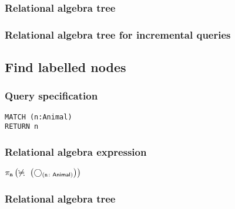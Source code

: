 \subsubsection*{Relational algebra tree}


\subsubsection*{Relational algebra tree for incremental queries}


\subsection{Find labelled nodes}

\subsubsection*{Query specification}

\begin{lstlisting}
MATCH (n:Animal)
RETURN n
\end{lstlisting}

\subsubsection*{Relational algebra expression}

$\projection{\var{n}} \left(\alldifferent{} \left(\getvertices{n}{Animal}\right)\right)$

\subsubsection*{Relational algebra tree}


